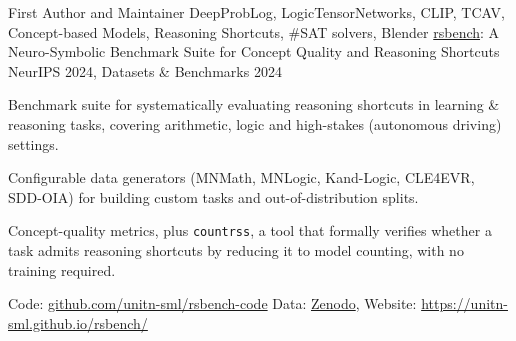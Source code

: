 \documentclass[11pt, a4paper]{awesome-cv}
\begin{document}
\begin{cventries}

  \cventry
    {First Author and Maintainer \textbullet{} DeepProbLog, LogicTensorNetworks, CLIP, TCAV, Concept-based Models, Reasoning Shortcuts, \#SAT solvers, Blender} %
    {\href{https://unitn-sml.github.io/rsbench/}{rsbench}: A Neuro-Symbolic Benchmark Suite for Concept Quality and Reasoning Shortcuts} %
    {NeurIPS 2024, Datasets \& Benchmarks} %
    {2024} %
    {
      \begin{cvitems}
        \item {Benchmark suite for systematically evaluating reasoning shortcuts in learning \& reasoning tasks, covering arithmetic, logic and high-stakes (autonomous driving) settings.}
        \item {Configurable data generators (MNMath, MNLogic, Kand-Logic, CLE4EVR, SDD-OIA) for building custom tasks and out-of-distribution splits.}
        \item {Concept-quality metrics, plus \texttt{countrss}, a tool that formally verifies whether a task admits reasoning shortcuts by reducing it to model counting, with no training required.}
        \item {Code: \href{https://github.com/unitn-sml/rsbench-code}{github.com/unitn-sml/rsbench-code} \textbullet{} Data: \href{https://zenodo.org/doi/10.5281/zenodo.11612555}{Zenodo}, Website: \href{https://unitn-sml.github.io/rsbench/}{https://unitn-sml.github.io/rsbench/}}
      \end{cvitems}
    }


\end{cventries}
\end{document}
